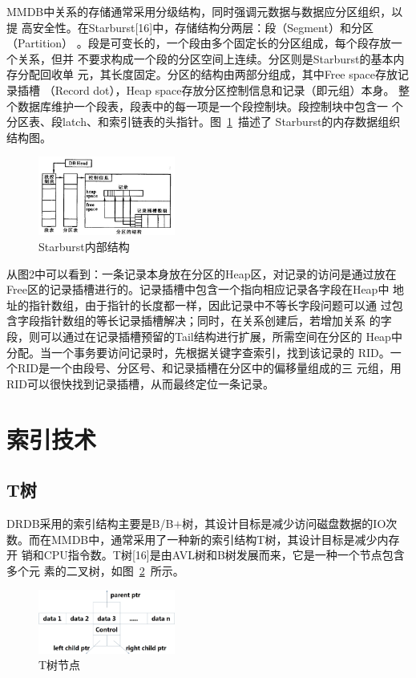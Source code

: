 \documentclass[literaturereview]{zjutreport}
\begin{document}
MMDB中关系的存储通常采用分级结构，同时强调元数据与数据应分区组织，以提
高安全性。在Starburst[16]中，存储结构分两层：段（Segment）和分区（Partition）
。段是可变长的，一个段由多个固定长的分区组成，每个段存放一个关系，但并
不要求构成一个段的分区空间上连续。分区则是Starburst的基本内存分配回收单
元，其长度固定。分区的结构由两部分组成，其中Free space存放记录插槽
（Record dot），Heap space存放分区控制信息和记录（即元组）本身。
整个数据库维护一个段表，段表中的每一项是一个段控制块。段控制块中包含一
个分区表、段latch、和索引链表的头指针。图~\ref{fig:starburst}~描述了
Starburst的内存数据组织结构图。

\begin{figure}[htbp]
\centering
\includegraphics[width=0.4\textwidth]{starburst}
\caption{Starburst内部结构}\label{fig:starburst}
\vspace{\baselineskip}
\end{figure}

从图2中可以看到：一条记录本身放在分区的Heap区，对记录的访问是通过放在
Free区的记录插槽进行的。记录插槽中包含一个指向相应记录各字段在Heap中
地址的指针数组，由于指针的长度都一样，因此记录中不等长字段问题可以通
过包含字段指针数组的等长记录插槽解决；同时，在关系创建后，若增加关系
的字段，则可以通过在记录插槽预留的Tail结构进行扩展，所需空间在分区的
Heap中分配。当一个事务要访问记录时，先根据关键字查索引，找到该记录的
RID。一个RID是一个由段号、分区号、和记录插槽在分区中的偏移量组成的三
元组，用RID可以很快找到记录插槽，从而最终定位一条记录。

\section{索引技术}
\subsection{T树}
DRDB采用的索引结构主要是B/B$+$树，其设计目标是减少访问磁盘数据的IO次
数。而在MMDB中，通常采用了一种新的索引结构T树，其设计目标是减少内存开
销和CPU指令数。T树[16]是由AVL树和B树发展而来，它是一种一个节点包含多个元
素的二叉树，如图~\ref{fig:treenode}~所示。

\begin{figure}[htbp]
\centering
\includegraphics[width=0.4\textwidth]{treenode}
\caption{T树节点}\label{fig:treenode}
\vspace{\baselineskip}
\end{figure}
\end{document}

